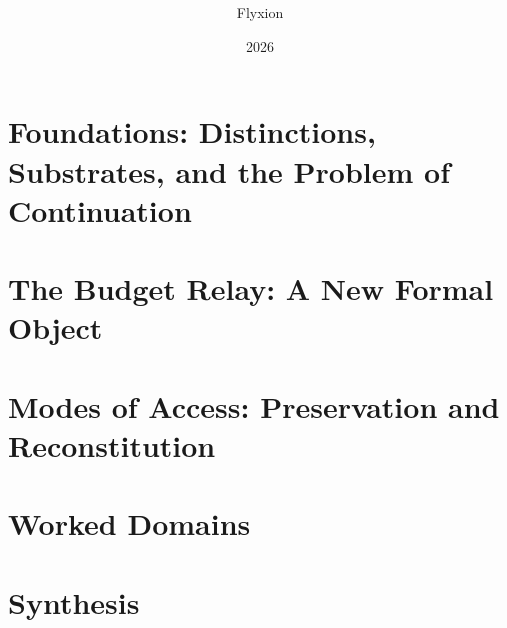 \documentclass[11pt,twoside,openright]{book}
\title{\booktitle\\\large \booksubtitle}
\author{Flyxion}
\date{2026}
\begin{document}
\frontmatter
\maketitle




\tableofcontents

\mainmatter

\part{Foundations: Distinctions, Substrates, and the Problem of Continuation}
\label{part:foundations}







\part{The Budget Relay: A New Formal Object}
\label{part:budget-relay}





\part{Modes of Access: Preservation and Reconstitution}
\label{part:modes-of-access}




\part{Worked Domains}
\label{part:worked-domains}









\part{Synthesis}
\label{part:synthesis}


\appendix







\backmatter

\printindex
\end{document}
